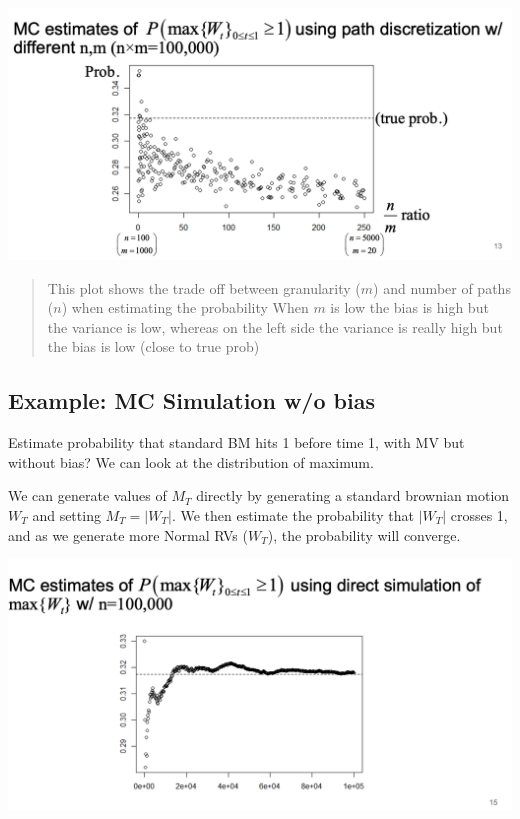 \documentclass[
  oneside]{book}
\begin{document}
\includegraphics{Notes/Obsidian-Attachments/11-Pricing-Derivatives-1.png}

\begin{quote}
This plot shows the trade off between granularity (\(m\)) and number of paths (\(n\)) when estimating the probability
When \(m\) is low the bias is high but the variance is low, whereas on the left side the variance is really high but the bias is low (close to true prob)
\end{quote}

\hypertarget{example-mc-simulation-wo-bias}{%
\subsection{Example: MC Simulation w/o bias}\label{example-mc-simulation-wo-bias}}

Estimate probability that standard BM hits 1 before time 1, with MV but without bias? We can look at the distribution of maximum.

We can generate values of \(M_{T}\) directly by generating a standard brownian motion \(W_{T}\) and setting \(M_{T} = |W_{T}|\). We then estimate the probability that \(|W_{T}|\) crosses 1, and as we generate more Normal RVs (\(W_{T}\)), the probability will converge.

\includegraphics{Notes/Obsidian-Attachments/11-Pricing-Derivatives-2.png}
\end{document}
